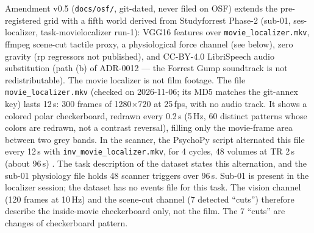 \documentclass{article}
\begin{document}
Amendment v0.5 (\texttt{docs/osf/}, git-dated, never filed on
OSF) extends the pre-registered grid with a fifth world derived
from Studyforrest Phase-2
\citep{hanke2016studyforrest, sengupta2016studyforrest} (sub-01, ses-localizer,
task-movielocalizer run-1): VGG16 features over
\texttt{movie\_localizer.mkv}, ffmpeg scene-cut tactile proxy, a
physiological force channel (see below), zero gravity (rp regressors
not published), and CC-BY-4.0 LibriSpeech audio substitution (path
(b) of ADR-0012 --- the Forrest Gump soundtrack is not
redistributable). The movie localizer is not film footage. The file
\texttt{movie\_localizer.mkv} (checked on 2026-11-06; its MD5 matches
the git-annex key) lasts 12\,s: 300 frames of 1280$\times$720 at
25\,fps, with no audio track. It shows a colored polar checkerboard,
redrawn every 0.2\,s (5\,Hz, 60 distinct patterns whose colors are
redrawn, not a contrast reversal), filling only the movie-frame area
between two grey bands. In the scanner, the PsychoPy script
alternated this file every 12\,s with
\texttt{inv\_movie\_localizer.mkv}, for 4 cycles, 48 volumes at TR
2\,s (about 96\,s) \citep[pp.~2, 4, 6]{sengupta2016studyforrest}.
The task description of the dataset states this alternation, and the
sub-01 physiology file holds 48 scanner triggers over 96\,s. Sub-01
is present in the localizer session; the dataset has no events file
for this task. The vision channel (120 frames at 10\,Hz) and the
scene-cut channel (7 detected ``cuts'') therefore describe the
inside-movie checkerboard only, not the film. The 7 ``cuts'' are
changes of checkerboard pattern.
\end{document}
